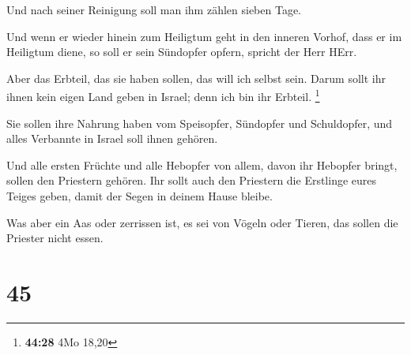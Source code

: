  Und nach seiner Reinigung soll man ihm zählen sieben
Tage.

 Und wenn er wieder hinein zum Heiligtum geht in den
inneren Vorhof, dass er im Heiligtum diene, so soll er sein Sündopfer
opfern, spricht der Herr HErr.

 Aber das Erbteil, das sie haben sollen, das will ich
selbst sein. Darum sollt ihr ihnen kein eigen Land geben in Israel; denn
ich bin ihr Erbteil. \footnote{\textbf{44:28} 4Mo 18,20}

 Sie sollen ihre Nahrung haben vom Speisopfer, Sündopfer
und Schuldopfer, und alles Verbannte in Israel soll ihnen gehören.

 Und alle ersten Früchte und alle Hebopfer von allem,
davon ihr Hebopfer bringt, sollen den Priestern gehören. Ihr sollt auch
den Priestern die Erstlinge eures Teiges geben, damit der Segen in
deinem Hause bleibe.

 Was aber ein Aas oder zerrissen ist, es sei von Vögeln
oder Tieren, das sollen die Priester nicht essen.

\hypertarget{section-44}{%
\section{45}\label{section-44}}


